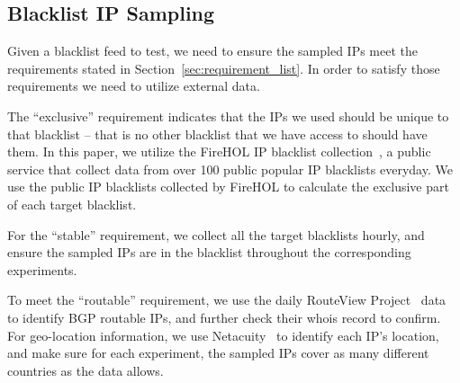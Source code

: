 

\subsection{Blacklist IP Sampling}
Given a blacklist feed to test, we need to ensure the sampled IPs meet the
requirements stated in Section~\ref{sec:requirement_list}. In order to
satisfy those requirements we need to utilize external data.

The ``exclusive'' requirement indicates that the IPs we used should be unique
to that blacklist -- that is no other blacklist that we have access to should
have them. In this paper, we utilize the FireHOL IP blacklist
collection~\cite{firehol}, a public service that collect data from over 100
public popular IP blacklists everyday. We use the public IP blacklists
collected by FireHOL to calculate the exclusive part of each target blacklist.

For the ``stable'' requirement, we collect all the target blacklists hourly,
and ensure the sampled IPs are in the blacklist throughout the corresponding
experiments.

To meet the ``routable'' requirement, we use the daily RouteView
Project~\cite{Routeview} data to identify BGP routable IPs, and further check
their whois record to confirm. For geo-location information, we use
Netacuity~\cite{netacuity} to identify each IP's location, and make sure for
each experiment, the sampled IPs cover as many different countries as the
data allows.



